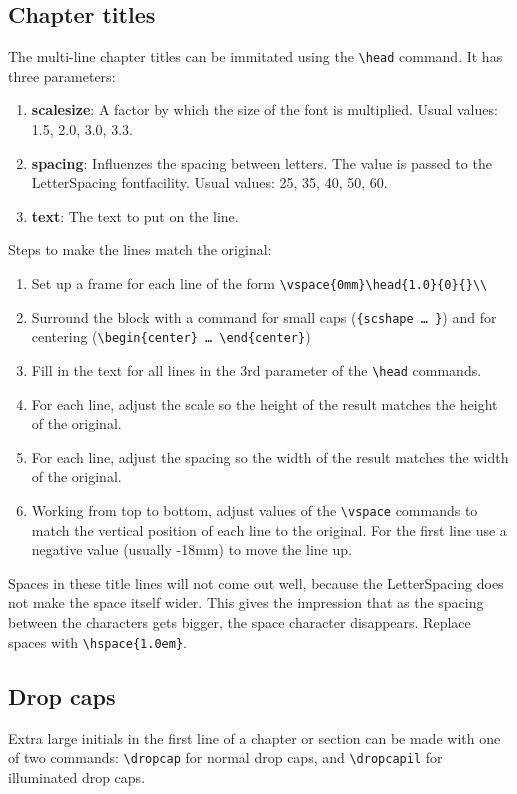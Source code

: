 \documentclass{report}
\begin{document}
%
\subsection{Chapter titles}
The multi-line chapter titles can be immitated using the \verb;\head;
command. It has three parameters:
\begin{enumerate}
\item {\ttfamily\bfseries scalesize}: A factor by which the size of
the font is multiplied. Usual values: 1.5, 2.0, 3.0, 3.3.
\item {\ttfamily\bfseries spacing}: Influenzes the spacing between letters.
The value is passed to the LetterSpacing fontfacility.
Usual values: 25, 35, 40, 50, 60.
\item {\ttfamily\bfseries text}: The text to put on the line.
\end{enumerate}
Steps to make the lines match the original:
\begin{enumerate}
\item Set up a frame for each line of the form
 \verb;\vspace{0mm}\head{1.0}{0}{}\\;
\item Surround the block with a command for small caps
(\verb;{scshape … };) and for centering (\verb;\begin{center} … \end{center};)
\item Fill in the text for all lines in the 3rd parameter of the \verb;\head;
commands.
\item For each line, adjust the scale so the height of the result matches 
the height of the original.
\item For each line, adjust the spacing so the width of the result matches
the width of the original.
\item Working from top to bottom, adjust values of the \verb;\vspace; commands
to match the vertical position of each line to the original. For the first line
use a negative value (usually -18mm) to move the line up.
\end{enumerate}
Spaces in these title lines will not come out well, because the LetterSpacing
does not make the space itself wider. This gives the impression that as the
spacing between the characters gets bigger, the space character disappears.
Replace spaces with \verb;\hspace{1.0em};.


%
\subsection{Drop caps}
Extra large initials in the first line of a chapter or section can be made
with one of two commands: \verb;\dropcap; for normal drop caps,
and \verb;\dropcapil; for illuminated drop caps.
\end{document}
